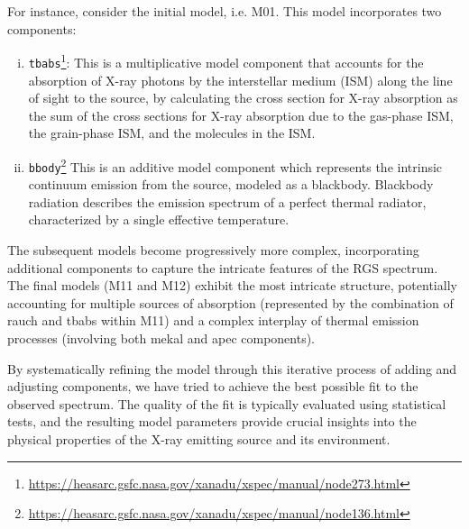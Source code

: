 		For instance, consider the initial model, i.e. M01. This model incorporates two components:
		\begin{enumerate}[i.]
			\item \texttt{tbabs}\footnote{\url{https://heasarc.gsfc.nasa.gov/xanadu/xspec/manual/node273.html}}: This is a multiplicative model component that accounts for the absorption of X-ray photons by the interstellar medium (ISM) along the line of sight to the source, by calculating the cross section for X-ray absorption as the sum of the cross sections for X-ray absorption due to the gas-phase ISM, the grain-phase ISM, and the molecules in the ISM.
			
			\item \texttt{bbody}\footnote{\url{https://heasarc.gsfc.nasa.gov/xanadu/xspec/manual/node136.html}} This is an additive model component which represents the intrinsic continuum emission from the source, modeled as a blackbody. Blackbody radiation describes the emission spectrum of a perfect thermal radiator, characterized by a single effective temperature.
		\end{enumerate}
		
		The subsequent models become progressively more complex, incorporating additional components to capture the intricate features of the RGS spectrum. The final models (M11 and M12) exhibit the most intricate structure, potentially accounting for multiple sources of absorption (represented by the combination of rauch and tbabs within M11) and a complex interplay of thermal emission processes (involving both mekal and apec components).
		
		By systematically refining the model through this iterative process of adding and adjusting components, we have tried to achieve the best possible fit to the observed spectrum. The quality of the fit is typically evaluated using statistical tests, and the resulting model parameters provide crucial insights into the physical properties of the X-ray emitting source and its environment.
  
